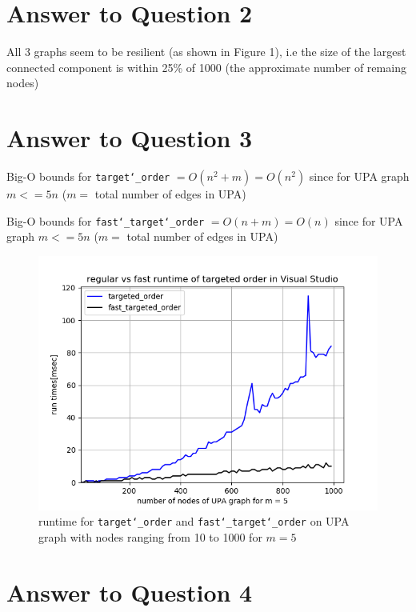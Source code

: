 \documentclass[a4paper]{article}
\begin{document}
\newpage
\section*{Answer to Question 2}
All 3 graphs seem to be resilient (as shown in Figure 1), i.e the size of the largest connected component is within 25\% of 1000 (the approximate number of remaing nodes)


\section*{Answer to Question 3}

Big-O bounds for \texttt{target\char`_order} $= O(n^2 + m) = O(n^2)$ since for UPA graph $m <= 5n$ ($m = $ total 
number of edges in UPA)

Big-O bounds for \texttt{fast\char`_target\char`_order} $= O(n + m) = O(n)$ since for UPA graph $m <= 5n$ ($m = $ total number of edges in UPA)

\FloatBarrier
\begin{figure}[h]
	\centering 
	\includegraphics[scale = 1.0, clip=false, trim=0cm 0cm 0cm 0cm]{Q3_targeted_order_time_comparision.png}
	\caption{runtime for \texttt{target\char`_order} and \texttt{fast\char`_target\char`_order} on UPA graph with nodes ranging from 10 to 1000 for $m = 5$}
\end{figure}
\FloatBarrier

\newpage
\section*{Answer to Question 4}
\end{document}

